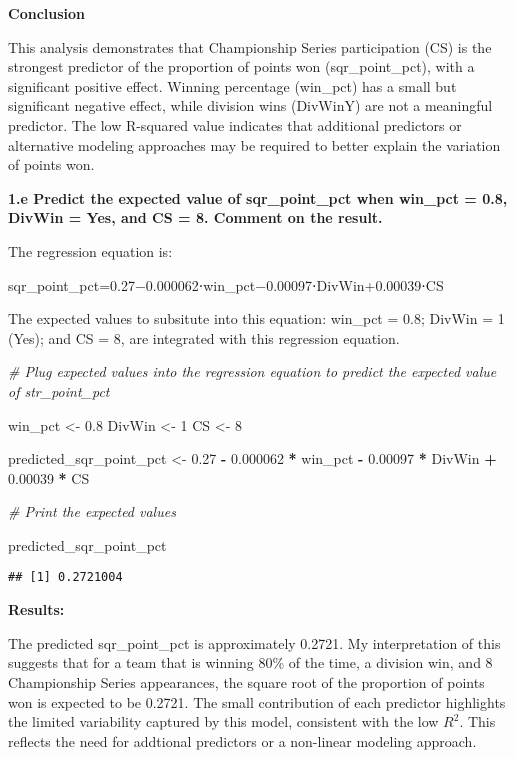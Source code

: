 \documentclass[
]{article}
\newenvironment{Shaded}{\begin{snugshade}}{\end{snugshade}}
\newcommand{\CommentTok}[1]{\textcolor[rgb]{0.56,0.35,0.01}{\textit{#1}}}
\newcommand{\DecValTok}[1]{\textcolor[rgb]{0.00,0.00,0.81}{#1}}
\newcommand{\FloatTok}[1]{\textcolor[rgb]{0.00,0.00,0.81}{#1}}
\newcommand{\NormalTok}[1]{#1}
\newcommand{\OtherTok}[1]{\textcolor[rgb]{0.56,0.35,0.01}{#1}}
\newcommand{\SpecialCharTok}[1]{\textcolor[rgb]{0.81,0.36,0.00}{\textbf{#1}}}
\begin{document}
\textbf{Conclusion}

This analysis demonstrates that Championship Series participation (CS)
is the strongest predictor of the proportion of points won
(sqr\_point\_pct), with a significant positive effect. Winning
percentage (win\_pct) has a small but significant negative effect, while
division wins (DivWinY) are not a meaningful predictor. The low
R-squared value indicates that additional predictors or alternative
modeling approaches may be required to better explain the variation of
points won.

\textbf{1.e Predict the expected value of sqr\_point\_pct when win\_pct
= 0.8, DivWin = Yes, and CS = 8. Comment on the result.}

The regression equation is:

sqr\_point\_pct=0.27−0.000062⋅win\_pct−0.00097⋅DivWin+0.00039⋅CS

The expected values to subsitute into this equation: win\_pct = 0.8;
DivWin = 1 (Yes); and CS = 8, are integrated with this regression
equation.

\begin{Shaded}
\begin{Highlighting}[]
\CommentTok{\# Plug expected values into the regression equation to predict the expected value of str\_point\_pct}

\NormalTok{win\_pct }\OtherTok{\textless{}{-}} \FloatTok{0.8}
\NormalTok{DivWin }\OtherTok{\textless{}{-}} \DecValTok{1}
\NormalTok{CS }\OtherTok{\textless{}{-}} \DecValTok{8}

\NormalTok{predicted\_sqr\_point\_pct }\OtherTok{\textless{}{-}} \FloatTok{0.27} \SpecialCharTok{{-}} \FloatTok{0.000062} \SpecialCharTok{*}\NormalTok{ win\_pct }\SpecialCharTok{{-}} \FloatTok{0.00097} \SpecialCharTok{*}\NormalTok{ DivWin }\SpecialCharTok{+} \FloatTok{0.00039} \SpecialCharTok{*}\NormalTok{ CS}

\CommentTok{\# Print the expected values}

\NormalTok{predicted\_sqr\_point\_pct}
\end{Highlighting}
\end{Shaded}

\begin{verbatim}
## [1] 0.2721004
\end{verbatim}

\textbf{Results:}

The predicted sqr\_point\_pct is approximately 0.2721. My interpretation
of this suggests that for a team that is winning 80\% of the time, a
division win, and 8 Championship Series appearances, the square root of
the proportion of points won is expected to be 0.2721. The small
contribution of each predictor highlights the limited variability
captured by this model, consistent with the low \(R^2\). This reflects
the need for addtional predictors or a non-linear modeling approach.
\end{document}
